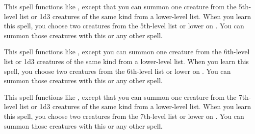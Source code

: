 \begin{spellheader}
\end{spellheader}
\begin{spellcontent}
    \spelleffect This spell functions like , except that you can summon one creature from the 5th-level list or 1d3 creatures of the same kind from a lower-level list. When you learn this spell, you choose two creatures from the 5th-level list or lower on . You can summon those creatures with this or any other  spell.
    \spelldur{\durshort \dismissable}
\end{spellcontent}
\begin{spellfooter}

\end{spellfooter}

\begin{spellheader}
\end{spellheader}
\begin{spellcontent}
    \spelleffect This spell functions like , except you can summon one creature from the 6th-level list or 1d3 creatures of the same kind from a lower-level list. When you learn this spell, you choose two creatures from the 6th-level list or lower on . You can summon those creatures with this or any other  spell.
    \spelldur{\durshort \dismissable}
\end{spellcontent}
\begin{spellfooter}

\end{spellfooter}

\begin{spellheader}
\end{spellheader}
\begin{spellcontent}
    \spelleffect This spell functions like , except that you can summon one creature from the 7th-level list or 1d3 creatures of the same kind from a lower-level list. When you learn this spell, you choose two creatures from the 7th-level list or lower on . You can summon those creatures with this or any other  spell.
    \spelldur{\durshort \dismissable}
\end{spellcontent}
\begin{spellfooter}

\end{spellfooter}

